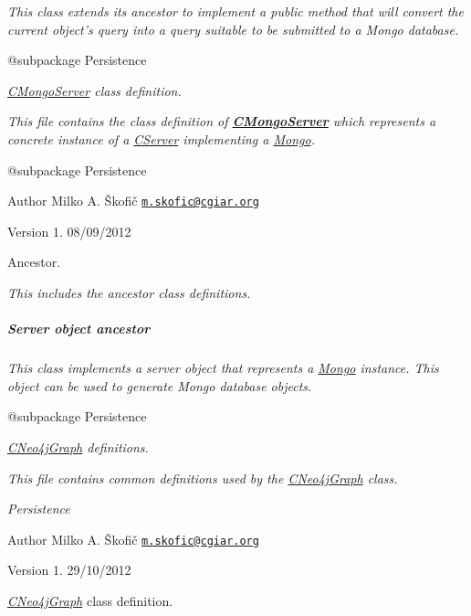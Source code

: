 {\itshape }

{\itshape This class extends its ancestor to implement a public method that will convert the current object's query into a query suitable to be submitted to a Mongo database.}

{\itshape \begin{DoxyVerb} @subpackage        Persistence\end{DoxyVerb}
}

{\itshape {\itshape \hyperlink{class_c_mongo_server}{C\-Mongo\-Server}} class definition.}

{\itshape This file contains the class definition of {\bfseries \hyperlink{class_c_mongo_server}{C\-Mongo\-Server}} which represents a concrete instance of a \hyperlink{class_c_server}{C\-Server} implementing a \hyperlink{}{Mongo}.}

{\itshape \begin{DoxyVerb} @subpackage        Persistence
\end{DoxyVerb}
}

{\itshape \begin{DoxyAuthor}{Author}
Milko A. Škofič \href{mailto:m.skofic@cgiar.org}{\tt m.\-skofic@cgiar.\-org} 
\end{DoxyAuthor}
\begin{DoxyVersion}{Version}
1. 08/09/2012
\end{DoxyVersion}
Ancestor.}

{\itshape This includes the ancestor class definitions. \subparagraph*{Server object ancestor}}

{\itshape }

{\itshape This class implements a server object that represents a \hyperlink{}{Mongo} instance. This object can be used to generate Mongo database objects.}

{\itshape \begin{DoxyVerb} @subpackage        Persistence\end{DoxyVerb}
}

{\itshape \hyperlink{class_c_neo4j_graph}{C\-Neo4j\-Graph} definitions.}

{\itshape This file contains common definitions used by the \hyperlink{class_c_neo4j_graph}{C\-Neo4j\-Graph} class.}

{\itshape  Persistence}

{\itshape \begin{DoxyAuthor}{Author}
Milko A. Škofič \href{mailto:m.skofic@cgiar.org}{\tt m.\-skofic@cgiar.\-org} 
\end{DoxyAuthor}
\begin{DoxyVersion}{Version}
1. 29/10/2012
\end{DoxyVersion}
{\itshape \hyperlink{class_c_neo4j_graph}{C\-Neo4j\-Graph}} class definition.}

